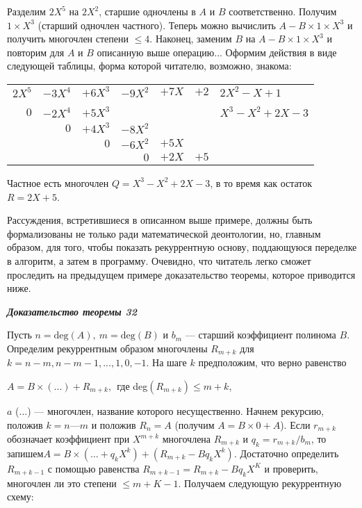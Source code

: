 Разделим $2X^5$ на $2X^2$, старшие одночлены в $A$ и $B$ соответственно. 
Получим $1 \times X^3$ (старший одночлен частного). Теперь можно вычислить 
$A - B \times 1 \times X^3$ и получить многочлен степени $\leq 4$. Наконец, заменим $B$ 
на $A - B \times 1 \times X^3$ и повторим для $A$ и $B$ описанную выше операцию... 
Оформим действия в виде следующей таблицы, форма которой  
читателю, возможно, знакома: 
\begin{table}[h!]
\centering
\begin{tabular}{rrrrrr|l}
$2X^5$ & $-3X^4$ & $+6X^3$ & $-9X^2$ & $+7X$ & $+2$ & $2X^2-X+1$     \\ \cline{7-7} 
\vspace{-9pt}& & & & & &\\
$0$    & $-2X^4$ & $+5X^3$ &         &       &      & $X^3-X^2+2X-3$ \\
       & $0$     & $+4X^3$ & $-8X^2$ &       &      &                \\
       &         & $0$     & $-6X^2$ & $+5X$ &      &                \\
       &         &         & $0$     & $+2X$ & $+5$ &               
\end{tabular}
\end{table}

Частное есть многочлен $Q = X^3 - X^2 + 2X - 3$, в то время как 
остаток $R = 2X + 5$. 

Рассуждения, встретившиеся в описанном выше примере, должны 
быть формализованы не только ради математической деонтологии, но, 
главным образом, для того, чтобы показать рекуррентную основу,  
поддающуюся переделке в алгоритм, а затем в программу. Очевидно, что 
читатель легко сможет проследить на предыдущем примере  
доказательство теоремы, которое приводится ниже. 

\noindent\textbf{\textit{Доказательство теоремы 32}}

Пусть $n = \text{deg}(A),\: m = \text{deg}(B)$ и $b_m$ — старший коэффициент  
полинома $B$. Определим рекуррентным образом многочлены $R_{m+k}$ для 
$k = n - m, n - m - 1, ..., 1,0, -1$. На шаге $k$ предположим, что верно 
равенство

\begin{center}
$A = B \times (...) + R_{m+k},\:\:$где deg$(R_{m+k}) \leqslant m + k$,
\end{center} 
\pagebreak

\noindent$a$ (...) — многочлен, название которого несущественно. Начнем  
рекурсию, положив $k = n — m$ и положив $R_n = A$ (получим $A = B \times 0 + A$). 
Если $r_{m+k}$ обозначает коэффициент при $X^{m+k}$ многочлена $R_{m+k}$ и 
$q_k = r_{m+k}\slash b_m$, то запишем\newline $A = B\times (... + q_kX^k) + (R_{m+k} - Bq_kX^k)$.  
Достаточно определить $R_{m+k-1}$ с помощью равенства $R_{m+k-1} = R_{m+k} - 
Bq_kX^K$ и проверить, многочлен ли это степени $\leqslant m + K - 1$. Получаем 
следующую рекуррентную схему:

